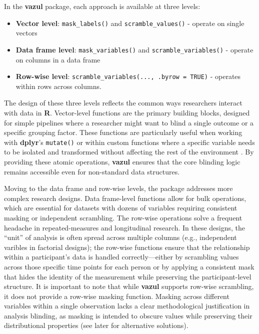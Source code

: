 In the \textbf{vazul} package, each approach is available at three levels:

\begin{itemize}
\tightlist
\item
  \textbf{Vector level}: \texttt{mask\_labels()} and \texttt{scramble\_values()} - operate on single vectors
\item
  \textbf{Data frame level}: \texttt{mask\_variables()} and \texttt{scramble\_variables()} - operate on columns in a data frame
\item
  \textbf{Row-wise level}: \texttt{scramble\_variables(...,\ .byrow\ =\ TRUE)} - operates within rows across columns.
\end{itemize}

The design of these three levels reflects the common ways researchers interact with data in \textbf{R}. Vector-level functions are the primary building blocks, designed for simple pipelines where a researcher might want to blind a single outcome or a specific grouping factor. These functions are particularly useful when working with \textbf{dplyr}'s \texttt{mutate()} or within custom functions where a specific variable needs to be isolated and transformed without affecting the rest of the environment \citep{Wickham2025-eh}. By providing these atomic operations, \textbf{vazul} ensures that the core blinding logic remains accessible even for non-standard data structures.

Moving to the data frame and row-wise levels, the package addresses more complex research designs. Data frame-level functions allow for bulk operations, which are essential for datasets with dozens of variables requiring consistent masking or independent scrambling. The row-wise operations solve a frequent headache in repeated-measures and longitudinal research. In these designs, the ``unit'' of analysis is often spread across multiple columns (e.g., independent varibles in factorial designs); the row-wise functions ensure that the relationship within a participant's data is handled correctly---either by scrambling values across those specific time points for each person or by applying a consistent mask that hides the identity of the measurement while preserving the participant-level structure. It is important to note that while \textbf{vazul} supports row-wise scrambling, it does not provide a row-wise masking function. Masking across different variables within a single observation lacks a clear methodological justification in analysis blinding, as masking is intended to obscure values while preserving their distributional properties (see later for alternative solutions).

